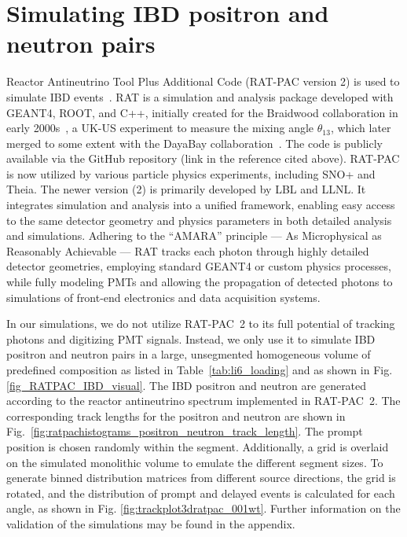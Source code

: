 \documentclass[tightenlines,twocolumn,prl,notitlepage,nofootinbib,preprintnumbers,longbibliography]{revtex4-1}
\begin{document}
\section{Simulating IBD positron and neutron pairs}
Reactor Antineutrino Tool Plus Additional Code (RAT-PAC version 2) is used to simulate IBD events~\cite{osti_2377202}.
RAT is a simulation and analysis package developed with GEANT4, ROOT, and C++, initially created for the Braidwood collaboration in early 2000s~\cite{BOLTON2005166}, a UK-US experiment to measure the mixing angle $\theta_{13}$, which later merged to some extent with the DayaBay collaboration~\cite{HAHN2006134}.
The code is publicly available via the GitHub repository (link in the reference cited above).
RAT-PAC is now utilized by various particle physics experiments, including SNO+ and Theia. 
The newer version (2) is primarily developed by LBL and LLNL.
It integrates simulation and analysis into a unified framework, enabling easy access to the same detector geometry and physics parameters in both detailed analysis and simulations. Adhering to the ``AMARA'' principle --- As Microphysical as Reasonably Achievable --- RAT tracks each photon through highly detailed detector geometries, employing standard GEANT4 or custom physics processes, while fully modeling PMTs and allowing the propagation of detected photons to simulations of front-end electronics and data acquisition systems.

In our simulations, we do not utilize RAT-PAC~2 to its full potential of tracking photons and digitizing PMT signals. Instead, we only use it to simulate IBD positron and neutron pairs in a large, unsegmented homogeneous volume of predefined composition as listed in Table~\ref{tab:li6_loading} and as shown in Fig. \ref{fig_RATPAC_IBD_visual}. 
The IBD positron and neutron are generated according to the reactor antineutrino spectrum implemented in RAT-PAC~2. The corresponding track lengths for the positron and neutron are shown in Fig.~\ref{fig:ratpachistograms_positron_neutron_track_length}. The prompt position is chosen randomly within the segment. Additionally, a grid is overlaid on the simulated monolithic volume to emulate the different segment sizes. To generate binned distribution matrices from different source directions, the grid is rotated, and the distribution of prompt and delayed events is calculated for each angle, as shown in Fig. \ref{fig:trackplot3dratpac_001wt}.
Further information on the validation of the simulations may be found in the appendix.
\end{document}
